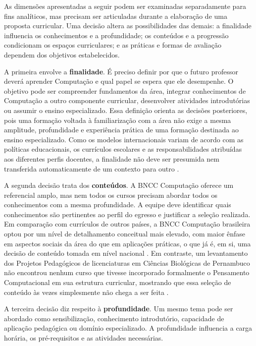 As dimensões apresentadas a seguir podem ser examinadas separadamente para fins analíticos, mas precisam ser articuladas durante a elaboração de uma proposta curricular. Uma decisão altera as possibilidades das demais: a finalidade influencia os conhecimentos e a profundidade; os conteúdos e a progressão condicionam os espaços curriculares; e as práticas e formas de avaliação dependem dos objetivos estabelecidos.

A primeira envolve a \textbf{finalidade}. É preciso definir por que o futuro professor deverá aprender Computação e qual papel se espera que ele desempenhe. O objetivo pode ser compreender fundamentos da área, integrar conhecimentos de Computação a outro componente curricular, desenvolver atividades introdutórias ou assumir o ensino especializado. Essa definição orienta as decisões posteriores, pois uma formação voltada à familiarização com a área não exige a mesma amplitude, profundidade e experiência prática de uma formação destinada ao ensino especializado. Como os modelos internacionais variam de acordo com as políticas educacionais, os currículos escolares e as responsabilidades atribuídas aos diferentes perfis docentes, a finalidade não deve ser presumida nem transferida automaticamente de um contexto para outro \cite{yadav2022review}.

A segunda decisão trata dos \textbf{conteúdos}. A BNCC Computação oferece um referencial amplo, mas nem todos os cursos precisam abordar todos os conhecimentos com a mesma profundidade. A equipe deve identificar quais conhecimentos são pertinentes ao perfil do egresso e justificar a seleção realizada. Em comparação com currículos de outros países, a BNCC Computação brasileira optou por um nível de detalhamento conceitual mais elevado, com maior ênfase em aspectos sociais da área do que em aplicações práticas, o que já é, em si, uma decisão de conteúdo tomada em nível nacional \cite{eloy2024posicionando}. Em contraste, um levantamento dos Projetos Pedagógicos de licenciaturas em Ciências Biológicas de Pernambuco não encontrou nenhum curso que tivesse incorporado formalmente o Pensamento Computacional em sua estrutura curricular, mostrando que essa seleção de conteúdo às vezes simplesmente não chega a ser feita \cite{santos2022integracao}.

A terceira decisão diz respeito à \textbf{profundidade}. Um mesmo tema pode ser abordado como sensibilização, conhecimento introdutório, capacidade de aplicação pedagógica ou domínio especializado. A profundidade influencia a carga horária, os pré-requisitos e as atividades necessárias.

